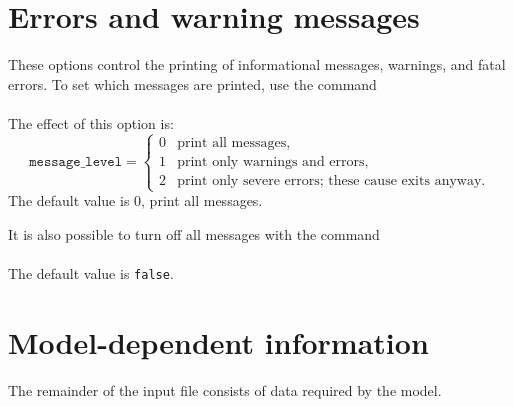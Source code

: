 \section{Errors and warning messages}
These options control the printing of informational messages,
warnings, and fatal errors.  To set which messages are printed,
use the command\\
  \\
The effect of this option is:
$$
  \texttt{message\_level} =
    \begin{cases}
       0& \text{print all messages},\\
       1& \text{print only warnings and errors},\\
       2& \text{print only severe errors; these cause exits anyway}.
    \end{cases}
$$
The default value is 0, print all messages.

It is also possible to turn off all messages with the command\\
  \\
The default value is \texttt{false}.

\section{Model-dependent information}\label{model-info}
The remainder of the input file consists of data required by the model. 
